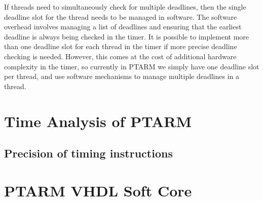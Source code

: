 If threads need to simultaneously check for multiple deadlines, then the single deadline slot for the thread needs to be managed in software.
The software overhead involves managing a list of deadlines and ensuring that the earliest deadline is always being checked in the timer. 
It is possible to implement more than one deadline slot for each thread in the timer if more precise deadline checking is needed. 
However, this comes at the cost of additional hardware complexity in the timer, so currently in PTARM we simply have one deadline slot per thread, and use software mechanisms to manage multiple deadlines in a thread. 

\section{Time Analysis of PTARM}
\label{sec:wcet}




 
\subsection{Precision of timing instructions}
\label{subsec:precision_timing_inst_ptarm}


\section{PTARM VHDL Soft Core}

